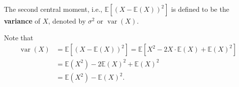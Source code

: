 \documentclass[11pt,singlecolumn, openany, citestyle=authoryear]{elegantbook}
\begin{document}
\begin{CJK}{UTF8}{gbsn}
\begin{definition}
    The second central moment, i.e., $\mathbb{E}[(X-\mathbb{E}(X))^2]$ is defined to be the 
    \textbf{variance} of $X$, denoted by $\sigma^2$ or $\operatorname{var}(X)$.
\end{definition}
\begin{remark}
    Note that 
    \begin{align*}
        \operatorname{var}(X)&=\mathbb{E}[(X-\mathbb{E}(X))^2] 
        = \mathbb{E}[X^2-2X\cdot \mathbb{E}(X) +\mathbb{E}(X)^2]\\
        &= \mathbb{E}(X^2)-2\mathbb{E}(X)^2 +\mathbb{E}(X)^2 \\
        &= \mathbb{E}(X^2)-\mathbb{E}(X)^2.
    \end{align*}
\end{remark}


\end{CJK}
\end{document}

